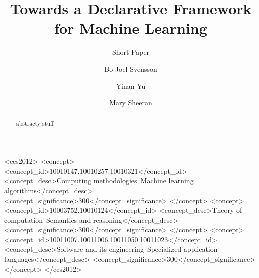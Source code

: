 \documentclass[sigplan,anonymous,review]{acmart}
\begin{document}
\title{Towards a Declarative Framework for Machine Learning}
\subtitle{Short Paper}


\author{Bo Joel Svensson}
\author{Yinan Yu}
\author{Mary Sheeran}

\renewcommand{\shortauthors}{Svensson, et al.}

\begin{abstract}

  abstracty stuff

\end{abstract}

\begin{CCSXML}
<ccs2012>
<concept>
<concept_id>10010147.10010257.10010321</concept_id>
<concept_desc>Computing methodologies~Machine learning algorithms</concept_desc>
<concept_significance>300</concept_significance>
</concept>
<concept>
<concept_id>10003752.10010124</concept_id>
<concept_desc>Theory of computation~Semantics and reasoning</concept_desc>
<concept_significance>300</concept_significance>
</concept>
<concept>
<concept_id>10011007.10011006.10011050.10011023</concept_id>
<concept_desc>Software and its engineering~Specialized application languages</concept_desc>
<concept_significance>300</concept_significance>
</concept>
</ccs2012>
\end{CCSXML}


\end{document}
